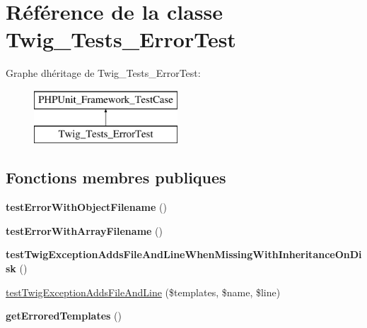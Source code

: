 \hypertarget{class_twig___tests___error_test}{}\section{Référence de la classe Twig\+\_\+\+Tests\+\_\+\+Error\+Test}
\label{class_twig___tests___error_test}
Graphe d\textquotesingle{}héritage de Twig\+\_\+\+Tests\+\_\+\+Error\+Test\+:\begin{figure}[H]
\begin{center}
\leavevmode
\includegraphics[height=2.000000cm]{class_twig___tests___error_test}
\end{center}
\end{figure}
\subsection*{Fonctions membres publiques}
\begin{DoxyCompactItemize}
\item 
{\bfseries test\+Error\+With\+Object\+Filename} ()\hypertarget{class_twig___tests___error_test_a9a8212b73bde91e5301aecd22aa2bd53}{}\label{class_twig___tests___error_test_a9a8212b73bde91e5301aecd22aa2bd53}

\item 
{\bfseries test\+Error\+With\+Array\+Filename} ()\hypertarget{class_twig___tests___error_test_a020d0bb78a0b129608a9b9724763636e}{}\label{class_twig___tests___error_test_a020d0bb78a0b129608a9b9724763636e}

\item 
{\bfseries test\+Twig\+Exception\+Adds\+File\+And\+Line\+When\+Missing\+With\+Inheritance\+On\+Disk} ()\hypertarget{class_twig___tests___error_test_affbf8221622adc194926fbbc68f9d4d5}{}\label{class_twig___tests___error_test_affbf8221622adc194926fbbc68f9d4d5}

\item 
\hyperlink{class_twig___tests___error_test_a990f962eb8597bba197398aafde3db47}{test\+Twig\+Exception\+Adds\+File\+And\+Line} (\$templates, \$name, \$line)
\item 
{\bfseries get\+Errored\+Templates} ()\hypertarget{class_twig___tests___error_test_a1559d09c41bff3ddd804e227cb02bb73}{}\label{class_twig___tests___error_test_a1559d09c41bff3ddd804e227cb02bb73}

\end{DoxyCompactItemize}


